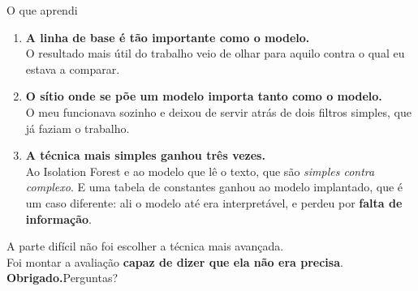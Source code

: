 \documentclass[aspectratio=169]{beamer}
\begin{document}
\begin{frame}[plain]{O que aprendi}
\begin{enumerate}
  \item \textbf{A linha de base é tão importante como o modelo.}\\
        \footnotesize O resultado mais útil do trabalho veio de olhar para aquilo contra o qual eu
        estava a comparar.\\[2mm]
  \item \textbf{O sítio onde se põe um modelo importa tanto como o modelo.}\\
        \footnotesize O meu funcionava sozinho e deixou de servir atrás de dois filtros simples,
        que já faziam o trabalho.\\[2mm]
  \item \textbf{A técnica mais simples ganhou três vezes.}\\
        \footnotesize Ao Isolation Forest e ao modelo que lê o texto, que são \emph{simples contra
        complexo}. E uma tabela de constantes ganhou ao modelo implantado, que é um caso
        diferente: ali o modelo até era interpretável, e perdeu por \textbf{falta de informação}.
\end{enumerate}
\vspace{4mm}
\begin{center}
\small A parte difícil não foi escolher a técnica mais avançada.\\
Foi montar a avaliação \textbf{capaz de dizer que ela não era precisa}.\\[6mm]
{\Large \textbf{Obrigado.}\quad Perguntas?}
\end{center}
\end{frame}
\end{document}
